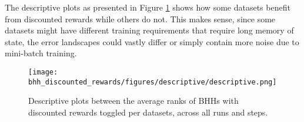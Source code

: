 \begin{table}[htbp]
      \centering
      \caption{Post Hoc Comparisons - BHH Variant: Discounted Rewards}
      \label{tab:results:discounted_rewards:post_hoc}%
      \par\bigskip
\end{table}

The descriptive plots as presented in Figure \ref{fig:results:discounted_rewards:descriptive:descriptive} shows how some datasets benefit from discounted rewards while others do not. This makes sense, since some datasets might have different training requirements that require long memory of state, the error landscapes could vastly differ or simply contain more noise due to mini-batch training.

\begin{figure}[htbp]
      \centering
      \texttt{[image: bhh\_discounted\_rewards/figures/descriptive/descriptive.png]}
      \caption{Descriptive plots between the average ranks of \Acsp{BHH} with discounted rewards toggled per datasets, across all runs and steps.}
      \label{fig:results:discounted_rewards:descriptive:descriptive}
\end{figure}

